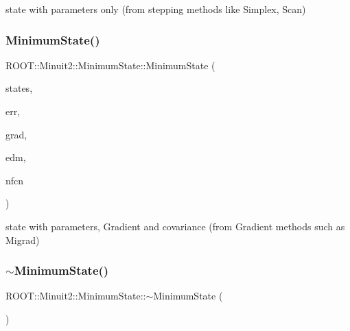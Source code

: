 state with parameters only (from stepping methods like Simplex, Scan) \mbox{\label{classROOT_1_1Minuit2_1_1MinimumState_a35c2e0098d60a9caeee9e2c60093b5a9}} 
\subsubsection{\texorpdfstring{MinimumState()}{MinimumState()}\hspace{0.1cm}{\footnotesize\ttfamily [11/12]}}
{\footnotesize\ttfamily R\+O\+O\+T\+::\+Minuit2\+::\+Minimum\+State\+::\+Minimum\+State (\begin{DoxyParamCaption}\item[{const \mbox{\hyperlink{classROOT_1_1Minuit2_1_1MinimumParameters}{Minimum\+Parameters}} \&}]{states,  }\item[{const \mbox{\hyperlink{classROOT_1_1Minuit2_1_1MinimumError}{Minimum\+Error}} \&}]{err,  }\item[{const \mbox{\hyperlink{classROOT_1_1Minuit2_1_1FunctionGradient}{Function\+Gradient}} \&}]{grad,  }\item[{double}]{edm,  }\item[{int}]{nfcn }\end{DoxyParamCaption})\hspace{0.3cm}{\ttfamily [inline]}}

state with parameters, Gradient and covariance (from Gradient methods such as Migrad) \mbox{\label{classROOT_1_1Minuit2_1_1MinimumState_a30666c7113d7e8c199d4de1b1a44ee03}} 
\subsubsection{\texorpdfstring{$\sim$MinimumState()}{~MinimumState()}\hspace{0.1cm}{\footnotesize\ttfamily [3/3]}}
{\footnotesize\ttfamily R\+O\+O\+T\+::\+Minuit2\+::\+Minimum\+State\+::$\sim$\+Minimum\+State (\begin{DoxyParamCaption}{ }\end{DoxyParamCaption})\hspace{0.3cm}{\ttfamily [inline]}}

